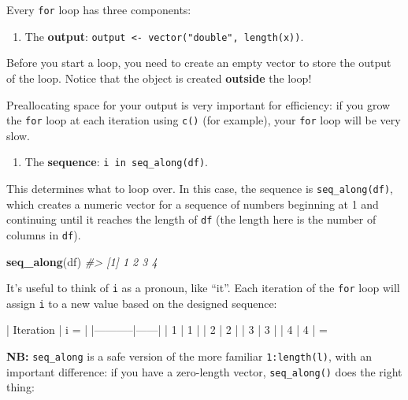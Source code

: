 \documentclass[]{book}
\newenvironment{Shaded}{\begin{snugshade}}{\end{snugshade}}
\newcommand{\CommentTok}[1]{\textcolor[rgb]{0.56,0.35,0.01}{\textit{#1}}}
\newcommand{\KeywordTok}[1]{\textcolor[rgb]{0.13,0.29,0.53}{\textbf{#1}}}
\newcommand{\NormalTok}[1]{#1}
\providecommand{\tightlist}{%
  \setlength{\itemsep}{0pt}\setlength{\parskip}{0pt}}
\begin{document}
Every \texttt{for} loop has three components:

\begin{enumerate}
\def\labelenumi{\arabic{enumi}.}
\tightlist
\item
  The \textbf{output}: \texttt{output\ \textless{}-\ vector("double",\ length(x))}.
\end{enumerate}

Before you start a loop, you need to create an empty vector to store the output of the loop. Notice that the object is created \textbf{outside} the loop!

Preallocating space for your output is very important for efficiency: if you grow the \texttt{for} loop at each iteration using \texttt{c()} (for example), your \texttt{for} loop will be very slow.

\begin{enumerate}
\def\labelenumi{\arabic{enumi}.}
\setcounter{enumi}{1}
\tightlist
\item
  The \textbf{sequence}: \texttt{i\ in\ seq\_along(df)}.
\end{enumerate}

This determines what to loop over. In this case, the sequence is \texttt{seq\_along(df)}, which creates a numeric vector for a sequence of numbers beginning at 1 and continuing until it reaches the length of \texttt{df} (the length here is the number of columns in \texttt{df}).

\begin{Shaded}
\begin{Highlighting}[]
\KeywordTok{seq_along}\NormalTok{(df)}
\CommentTok{#> [1] 1 2 3 4}
\end{Highlighting}
\end{Shaded}

It's useful to think of \texttt{i} as a pronoun, like ``it''. Each iteration of the \texttt{for} loop will assign \texttt{i} to a new value based on the designed sequence:

\begin{Shaded}
\begin{Highlighting}[]
\NormalTok{| Iteration | i =  |}
\NormalTok{|-----------|------|}
\NormalTok{| 1         | 1    | }
\NormalTok{| 2         | 2    | }
\NormalTok{| 3         | 3    | }
\NormalTok{| 4         | 4    | }
\NormalTok{=}
\end{Highlighting}
\end{Shaded}

\textbf{NB:} \texttt{seq\_along} is a safe version of the more familiar \texttt{1:length(l)}, with an important difference: if you have a zero-length vector, \texttt{seq\_along()} does the right thing:
\end{document}
